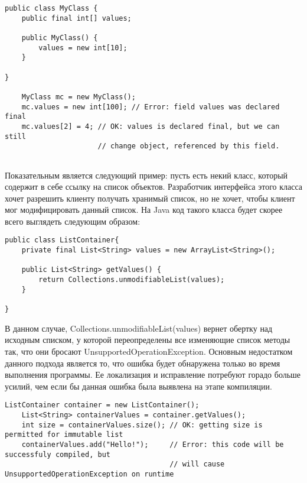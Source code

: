 \begin{lstlisting}[caption=Ключевое слово final, label=code:java_final]
public class MyClass {
    public final int[] values;
	
	public MyClass() {
		values = new int[10];    
	}
	
}

    MyClass mc = new MyClass();
    mc.values = new int[100]; // Error: field values was declared final
    mc.values[2] = 4; // OK: values is declared final, but we can still
                      // change object, referenced by this field.
    
\end{lstlisting}


Показательным является следующий пример: пусть есть некий класс, который содержит в себе ссылку на список объектов. Разработчик интерфейса этого класса хочет разрешить клиенту получать хранимый список, но не хочет, чтобы клиент мог модифицировать данный список. На Java код такого класса будет скорее всего выглядеть следующим образом:

\begin{lstlisting}[caption=Неизменяемый список, label=code:java_immutable_list]
public class ListContainer{
    private final List<String> values = new ArrayList<String>();   
    
    public List<String> getValues() {
        return Collections.unmodifiableList(values);
    }
    
}
\end{lstlisting}

В данном случае, Collections.unmodifiableList(values) вернет обертку над исходным списком, у которой переопределены все изменяющие список методы так, что они бросают UnsupportedOperationException. Основным недостатком данного подхода является то, что ошибка будет обнаружена только во время выполнения программы. Ее локализация и исправление потребуют горадо больше усилий, чем если бы данная ошибка была выявлена на этапе компиляции.

\begin{lstlisting}[caption=Использование неизменяемого списка, label=code:java_immutable_list_usage]
	ListContainer container = new ListContainer();
	List<String> containerValues = container.getValues();
	int size = containerValues.size(); // OK: getting size is permitted for immutable list
	containerValues.add("Hello!");     // Error: this code will be successfuly compiled, but 
	                                   // will cause UnsupportedOperationException on runtime	
\end{lstlisting}

